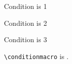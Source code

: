 \documentclass{article}
\begin{document}
\ifnum{} Condition is 1\fi

\ifnum{} Condition is 2\fi

\ifnum{} Condition is 3\fi

\verb|\conditionmacro| is \texttt{\meaning\conditionmacro}.
\end{document}
